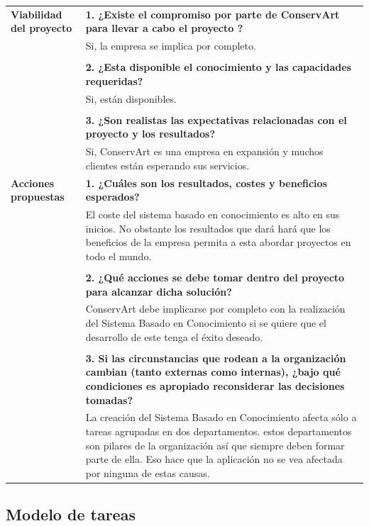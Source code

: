 \documentclass[a4paper,11pt]{article}
\begin{document}
			\begin{center}
				\begin{tabular}{| p{4.5cm} | p{7cm} |}
					\hline
					\textbf{Viabilidad del proyecto} & 
					\textbf{1. ¿Existe el compromiso por parte de ConservArt  para llevar a
					cabo el proyecto ?}\\
					& Si, la empresa se implica por completo.\\
					& \\
					& \textbf{2. ¿Esta disponible el conocimiento y las capacidades requeridas?}\\
					& Si, están disponibles.\\
					& \\
					& \textbf{3. ¿Son realistas las expectativas relacionadas  con el proyecto
					y los resultados?}\\
					& Si, ConservArt es una empresa en expansión y muchos clientes están
					esperando sus servicios.\\
					\hline
					\textbf{Acciones propuestas} & 
					\textbf{1. ¿Cuáles son los resultados, costes y beneficios esperados?}\\
					& El coste del sistema basado en conocimiento es alto en sus inicios. No
					obstante los resultados que dará hará que los beneficios de la empresa permita a esta abordar proyectos en todo el mundo.\\
					& \\
					& \textbf{2. ¿Qué acciones se debe tomar dentro del proyecto para alcanzar
					dicha solución?}\\
					& ConservArt debe implicarse por completo con la realización del Sistema
					Basado en Conocimiento si se quiere que el desarrollo de este tenga el éxito deseado.\\
					& \\
					& \textbf{3. Si las circunstancias que rodean a la organización cambian
					(tanto externas como internas), ¿bajo qué condiciones es apropiado
					reconsiderar las decisiones tomadas?}\\
					& La creación del Sistema Basado en Conocimiento afecta sólo a tareas agrupadas en dos departamentos. estos departamentos son pilares de la organización así que siempre deben formar parte de ella. Eso hace que la aplicación no se vea afectada por ninguna de estas causas.\\
					\hline
				\end{tabular}
			\end{center}
		\newpage
		\subsection{Modelo de tareas}
\end{document}
